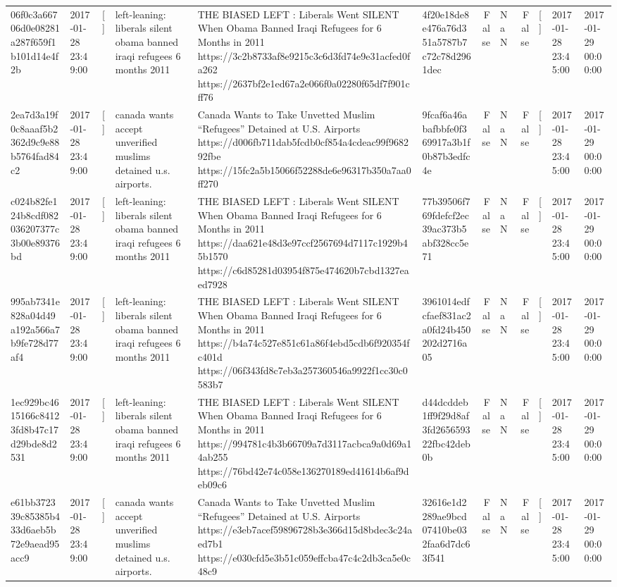 \begin{tabular}{llllllrlrlll}
06f0c3a66706d0e08281a287f659f1b101d14e4f2b & 2017-01-28 23:49:00 & [] & left-leaning: liberals silent obama banned iraqi refugees 6 months 2011 & THE BIASED LEFT : Liberals Went SILENT When Obama Banned Iraqi Refugees for 6 Months in 2011 https://3c2b8733af8e9215c3c6d3fd74e9e31acfed0fa262 https://2637bf2e1ed67a2e066f0a02280f65df7f901cff76 & 4f20e18de8e476a76d351a5787b7c72c78d2961dec & False & NaN & False & [] & 2017-01-28 23:45:00 & 2017-01-29 00:00:00 \\
2ea7d3a19f0c8aaaf5b2362d9c9e88b5764fad84c2 & 2017-01-28 23:49:00 & [] & canada wants accept unverified muslims detained u.s. airports. & Canada Wants to Take Unvetted Muslim “Refugees” Detained at U.S. Airports https://d006fb711dab5fcdb0cf854a4cdeac99f968292fbe https://15fc2a5b15066f52288de6e96317b350a7aa0ff270 & 9fcaf6a46abafbbfe0f369917a3b1f0b87b3edfc4e & False & NaN & False & [] & 2017-01-28 23:45:00 & 2017-01-29 00:00:00 \\
c024b82fe124b8cdf082036207377c3b00e89376bd & 2017-01-28 23:49:00 & [] & left-leaning: liberals silent obama banned iraqi refugees 6 months 2011 & THE BIASED LEFT : Liberals Went SILENT When Obama Banned Iraqi Refugees for 6 Months in 2011 https://daa621e48d3e97ccf2567694d7117c1929b45b1570 https://c6d85281d03954f875e474620b7cbd1327eaed7928 & 77b39506f769fdefcf2ec39ac373b5abf328cc5e71 & False & NaN & False & [] & 2017-01-28 23:45:00 & 2017-01-29 00:00:00 \\
995ab7341e828a04d49a192a566a7b9fe728d77af4 & 2017-01-28 23:49:00 & [] & left-leaning: liberals silent obama banned iraqi refugees 6 months 2011 & THE BIASED LEFT : Liberals Went SILENT When Obama Banned Iraqi Refugees for 6 Months in 2011 https://b4a74c527e851c61a86f4ebd5cdb6f920354fc401d https://06f343fd8c7eb3a257360546a9922f1cc30c0583b7 & 3961014edfcfaef831ac2a0fd24b450202d2716a05 & False & NaN & False & [] & 2017-01-28 23:45:00 & 2017-01-29 00:00:00 \\
1ec929bc4615166c84123fd8b47c17d29bde8d2531 & 2017-01-28 23:49:00 & [] & left-leaning: liberals silent obama banned iraqi refugees 6 months 2011 & THE BIASED LEFT : Liberals Went SILENT When Obama Banned Iraqi Refugees for 6 Months in 2011 https://994781c4b3b66709a7d3117acbca9a0d69a14ab255 https://76bd42e74c058e136270189ed41614b6af9deb09c6 & d44dcddeb1ff9f29d8af3fd265659322fbc42deb0b & False & NaN & False & [] & 2017-01-28 23:45:00 & 2017-01-29 00:00:00 \\
e61bb372339c85385b433d6aeb5b72e9aead95acc9 & 2017-01-28 23:49:00 & [] & canada wants accept unverified muslims detained u.s. airports. & Canada Wants to Take Unvetted Muslim “Refugees” Detained at U.S. Airports https://e3eb7acef59896728b3e366d15d8bdec3c24aed7b1 https://e030cfd5e3b51c059effcba47c4c2db3ca5e0c48c9 & 32616e1d2289ae9bcd07410be032faa6d7dc63f541 & False & NaN & False & [] & 2017-01-28 23:45:00 & 2017-01-29 00:00:00 \\

\end{tabular}
